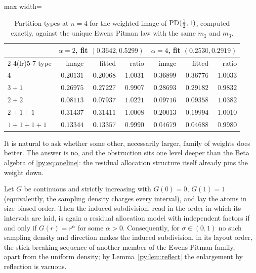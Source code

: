 \begin{table}[t]
\centering
\caption{Partition types at $n = 4$ for the weighted image of $\mathrm{PD}(\tfrac12,1)$, computed exactly,
against the unique Ewens Pitman law with the same $m_2$ and $m_3$.}
\label{py:tab:n4}
\small
\begin{adjustbox}{max width=\textwidth}
\begin{tabular}{lrrrrrr}
\toprule
& \multicolumn{3}{c}{$\alpha = 2$, fit $(0.3642, 0.5299)$} & \multicolumn{3}{c}{$\alpha = 4$, fit $(0.2530, 0.2919)$}\\
\cmidrule(lr){2-4}\cmidrule(lr){5-7}
type & image & fitted & ratio & image & fitted & ratio\\
\midrule
$4$             & $0.20131$ & $0.20068$ & $1.0031$ & $0.36899$ & $0.36776$ & $1.0033$\\
$3{+}1$         & $0.26975$ & $0.27227$ & $0.9907$ & $0.28693$ & $0.29182$ & $0.9832$\\
$2{+}2$         & $0.08113$ & $0.07937$ & $1.0221$ & $0.09716$ & $0.09358$ & $1.0382$\\
$2{+}1{+}1$     & $0.31437$ & $0.31411$ & $1.0008$ & $0.20013$ & $0.19994$ & $1.0010$\\
$1{+}1{+}1{+}1$ & $0.13344$ & $0.13357$ & $0.9990$ & $0.04679$ & $0.04688$ & $0.9980$\\
\bottomrule
\end{tabular}
\end{adjustbox}
\end{table}

It is natural to ask whether some other, necessarily larger, family of weights does better. The
answer is no, and the obstruction sits one level deeper than the Beta algebra of
\eqref{py:eq:oneline}: the residual allocation structure itself already pins the weight down.

\begin{theorem}
\label{py:thm:rigid}
Let $G$ be continuous and strictly increasing with $G(0)=0$, $G(1)=1$ (equivalently, the sampling density charges every interval), and lay the atoms in
size biased order. Then the induced subdivision, read in the order in which its intervals are laid, is again a residual allocation model with
independent factors if and only if $G(r) = r^{\alpha}$ for some $\alpha > 0$. Consequently, for
$\sigma \in (0,1)$ no such sampling density and direction makes the induced subdivision, in its layout order, the stick breaking sequence of
another member of the Ewens Pitman family, apart from the uniform density; by
Lemma~\ref{py:lem:reflect} the enlargement by reflection is vacuous.
\end{theorem}

